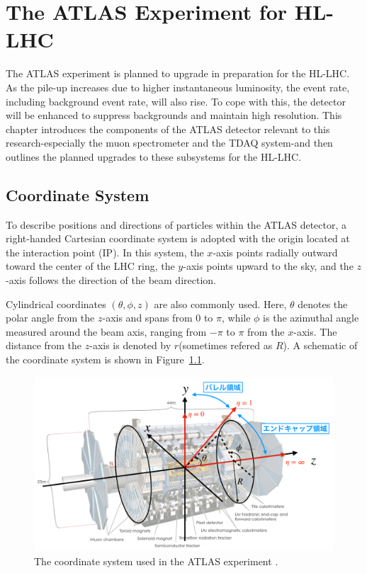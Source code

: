 \chapter{The ATLAS Experiment for HL-LHC} \label{ch:ATLASforHLLHC} 
The ATLAS experiment is planned to upgrade in preparation for the HL-LHC. As the pile-up increases due to higher instantaneous luminosity, the event rate, including background event rate, will also rise. To cope with this, the detector will be enhanced to suppress backgrounds and maintain high resolution. This chapter introduces the components of the ATLAS detector relevant to this research-especially the muon spectrometer and the TDAQ system-and then outlines the planned upgrades to these subsystems for the HL-LHC.
\section{Coordinate System} \label{sec:CoordinateSystem}
To describe positions and directions of particles within the ATLAS detector, a right-handed Cartesian coordinate system is adopted with the origin located at the interaction point (IP). In this system, the \(x\)-axis points radially outward toward the center of the LHC ring, the \(y\)-axis points upward to the sky, and the \(z\)-axis follows the direction of the beam direction. 

Cylindrical coordinates \((\theta, \phi, z)\) are also commonly used. Here, \(\theta\) denotes the polar angle from the \(z\)-axis and spans from \(0\) to \(\pi\), while \(\phi\) is the azimuthal angle measured around the beam axis, ranging from \(-\pi\) to \(\pi\) from the \(x\)-axis. The distance from the \(z\)-axis is denoted by \(r\)(sometimes refered as \(R\)). A schematic of the coordinate system is shown in Figure~\ref{fig:ATLASCoordinate}.

\begin{figure}[htbp]
  \centering
  \includegraphics[width=1.0\textwidth]{figs/chapter2/ATLAS_coordinate.png}
  \caption{The coordinate system used in the ATLAS experiment \cite{mino}.}
  \label{fig:ATLASCoordinate}
\end{figure}

